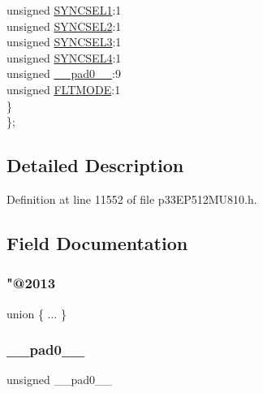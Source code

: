 \begin{DoxyCompactItemize}
\begin{tabbing}
\>\>unsigned \hyperlink{structtag_o_c7_c_o_n2_b_i_t_s_a50e73f95ab1c258ddc64f69c0991deaf}{SYNCSEL1}:1\\
\>\>unsigned \hyperlink{structtag_o_c7_c_o_n2_b_i_t_s_a304907a5d2c4cbf1114a54642a85951e}{SYNCSEL2}:1\\
\>\>unsigned \hyperlink{structtag_o_c7_c_o_n2_b_i_t_s_a6bbd1bd2ead6c9fa713969c6eb0f0c75}{SYNCSEL3}:1\\
\>\>unsigned \hyperlink{structtag_o_c7_c_o_n2_b_i_t_s_a0cd5bbe196c7974953909d27a6307bb7}{SYNCSEL4}:1\\
\>\>unsigned \hyperlink{structtag_o_c7_c_o_n2_b_i_t_s_adf71f3d8410c1f1dbbc96680a92c49af}{\_\_pad0\_\_}:9\\
\>\>unsigned \hyperlink{structtag_o_c7_c_o_n2_b_i_t_s_ad53c2a5303780172219bfd5e0100c782}{FLTMODE}:1\\
\>\} \\
\}; \\

\end{tabbing}\end{DoxyCompactItemize}


\subsection{Detailed Description}


Definition at line 11552 of file p33\+E\+P512\+M\+U810.\+h.



\subsection{Field Documentation}
\mbox{\label{structtag_o_c7_c_o_n2_b_i_t_s_aa56ef1056d8274fe925714c66b70076d}} 
\subsubsection{\texorpdfstring{"@2013}{@2013}}
{\footnotesize\ttfamily union \{ ... \} }

\mbox{\label{structtag_o_c7_c_o_n2_b_i_t_s_adf71f3d8410c1f1dbbc96680a92c49af}} 
\subsubsection{\texorpdfstring{\+\_\+\+\_\+pad0\+\_\+\+\_\+}{\_\_pad0\_\_}}
{\footnotesize\ttfamily unsigned \+\_\+\+\_\+pad0\+\_\+\+\_\+}



